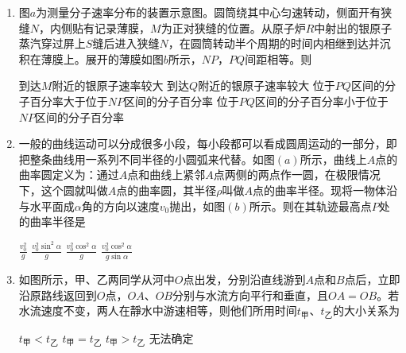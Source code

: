 \begin{enumerate}[leftmargin=0em]
\item 
{}
图$ a $为测量分子速率分布的装置示意图。圆筒绕其中心匀速转动，侧面开有狭缝$ N $，内侧贴有记录薄膜，$ M $为正对狭缝的位置。从原子炉$ R $中射出的银原子蒸汽穿过屏上$ S $缝后进入狭缝$ N $，在圆筒转动半个周期的时间内相继到达并沉积在薄膜上。展开的薄膜如图$ b $所示，$ NP $，$ PQ $间距相等。则  
\begin{figure}[h!]
\centering

\end{figure}

\fourchoices
{到达$ M $附近的银原子速率较大}
{到达$ Q $附近的银原子速率较大}
{位于$ PQ $区间的分子百分率大于位于$ NP $区间的分子百分率}
{位于$ PQ $区间的分子百分率小于位于$ NP $区间的分子百分率}



\item 
{}
一般的曲线运动可以分成很多小段，每小段都可以看成圆周运动的一部分，即把整条曲线用一系列不同半径的小圆弧来代替。如图$ (a) $所示，曲线上$ A $点的曲率圆定义为：通过$ A $点和曲线上紧邻$ A $点两侧的两点作一圆，在极限情况下，这个圆就叫做$ A $点的曲率圆，其半径$ \rho $叫做$ A $点的曲率半径。现将一物体沿与水平面成$ \alpha $角的方向以速度$ v_{0} $抛出，如图$ (b) $所示。则在其轨迹最高点$ P $处的曲率半径是  
\begin{figure}[h!]
\centering

\end{figure}

\fourchoices
{$ \frac { v _ { 0 } ^ { 2 } } { g } $}
{$ \frac { v _ { 0 } ^ { 2 } \sin ^ { 2 } \alpha } { g } $}
{$ \frac { v _ { 0 } ^ { 2 } \cos ^ { 2 } \alpha } { g } $}
{$ \frac { v _ { 0 } ^ { 2 } \cos ^ { 2 } \alpha } { g \sin \alpha } $}




\item 
{}
如图所示，甲、乙两同学从河中$ O $点出发，分别沿直线游到$ A $点和$ B $点后，立即沿原路线返回到$ O $点，$ OA $、$ OB $分别与水流方向平行和垂直，且$ OA=OB $。若水流速度不变，两人在靜水中游速相等，则他们所用时间$ t_{ \text{甲} } $、$ t_{ \text{乙} } $的大小关系为
\begin{figure}[h!]
\centering

\end{figure}

\fourchoices
{$ t_{ \text{甲} } < t_{ \text{乙} } $}
{$ t_{ \text{甲} } = t_{ \text{乙} } $}
{$ t_{ \text{甲} } > t_{ \text{乙} } $}
{无法确定}






\end{enumerate}
